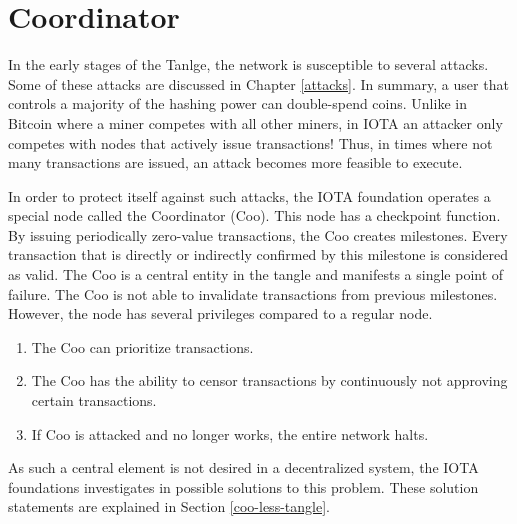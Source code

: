 \section{Coordinator}\label{coordinator}
In the early stages of the Tanlge, the network is susceptible to several attacks. Some of these attacks are discussed in Chapter \ref{attacks}. In summary, a user that controls a majority of the hashing power can double-spend coins. Unlike in Bitcoin where a miner competes with all other miners, in IOTA an attacker only competes with nodes that actively issue transactions! Thus, in times where not many transactions are issued, an attack becomes more feasible to execute.

In order to protect itself against such attacks, the IOTA foundation operates a special node called the Coordinator (Coo). This node has a checkpoint function. By issuing periodically zero-value transactions, the Coo creates milestones. Every transaction that is directly or indirectly confirmed by this milestone is considered as valid. The Coo is a central entity in the tangle and manifests a single point of failure. The Coo is not able to invalidate transactions from previous milestones. However, the node has several privileges compared to a regular node.

\begin{enumerate}
    \item The Coo can prioritize transactions.
    \item The Coo has the ability to censor transactions by continuously not approving certain transactions.
    \item If Coo is attacked and no longer works, the entire network halts.
\end{enumerate}

As such a central element is not desired in a decentralized system, the IOTA foundations investigates in possible solutions to this problem. These solution statements are explained in Section \ref{coo-less-tangle}.